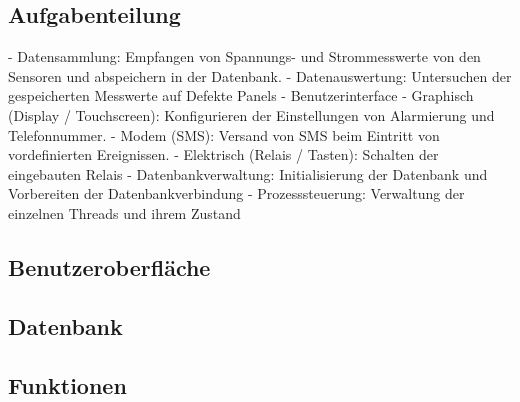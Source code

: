 \subsection{Aufgabenteilung}
\label{subsec:software:master:taskSeparation}

 - Datensammlung: Empfangen von Spannungs- und Strommesswerte von den Sensoren und abspeichern in der Datenbank.
 - Datenauswertung: Untersuchen der gespeicherten Messwerte auf Defekte Panels
 - Benutzerinterface
   - Graphisch (Display / Touchscreen): Konfigurieren der Einstellungen von Alarmierung und Telefonnummer.
   - Modem (SMS): Versand von SMS beim Eintritt von vordefinierten Ereignissen.
   - Elektrisch (Relais / Tasten): Schalten der eingebauten Relais
 - Datenbankverwaltung: Initialisierung der Datenbank und Vorbereiten der Datenbankverbindung
 - Prozesssteuerung: Verwaltung der einzelnen Threads und ihrem Zustand


\subsection{Benutzeroberfl\"ache}
\label{subsec:software:master:GUI}

\subsection{Datenbank}
\label{subsec:software:master:database}

\subsection{Funktionen}
\label{subsec:software:master:functions}
